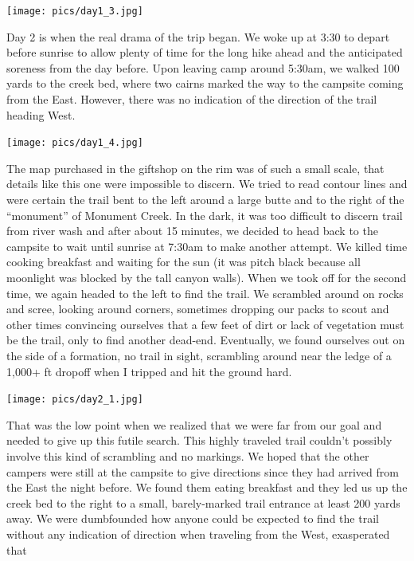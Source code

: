 \documentclass[10pt,a4paper]{article}
\newenvironment{Figure}
  {\par\medskip\noindent\minipage{\linewidth}}
  {\endminipage\par\medskip}
\begin{document}
\begin{multicols}{2}
\begin{Figure}
 \centering
 \texttt{[image: pics/day1\_3.jpg]}
\end{Figure}

Day 2 is when the real drama of the trip began. We woke up at 3:30 to depart before sunrise to allow plenty of time for the long hike ahead and the anticipated soreness from the day before. Upon leaving camp around 5:30am, we walked 100 yards to the creek bed, where two cairns marked the way to the campsite coming from the East. However, there was no indication of the direction of the trail heading West. 

\begin{Figure}
 \centering
 \texttt{[image: pics/day1\_4.jpg]}
\end{Figure}


The map purchased in the giftshop on the rim was of such a small scale, that details like this one were impossible to discern. We tried to read contour lines and were certain the trail bent to the left around a large butte and to the right of the “monument” of Monument Creek. In the dark, it was too difficult to discern trail from river wash and after about 15 minutes, we decided to head back to the campsite to wait until sunrise at 7:30am to make another attempt. We killed time cooking breakfast and waiting for the sun (it was pitch black because all moonlight was blocked by the tall canyon walls). When we took off for the second time, we again headed to the left to find the trail. We scrambled around on rocks and scree, looking around corners, sometimes dropping our packs to scout and other times convincing ourselves that a few feet of dirt or lack of vegetation must be the trail, only to find another dead-end. Eventually, we found ourselves out on the side of a formation, no trail in sight, scrambling around near the ledge of a 1,000+ ft dropoff when I tripped and hit the ground hard.

\begin{Figure}
 \centering
 \texttt{[image: pics/day2\_1.jpg]}
\end{Figure}

 That was the low point when we realized that we were far from our goal and needed to give up this futile search. This highly traveled trail couldn't possibly involve this kind of scrambling and no markings. We hoped that the other campers were still at the campsite to give directions since they had arrived from the East the night before. We found them eating breakfast and they led us up the creek bed to the right to a small, barely-marked trail entrance at least 200 yards away. We were dumbfounded how anyone could be expected to find the trail without any indication of direction when traveling from the West, exasperated that 


\end{multicols}
\end{document}
